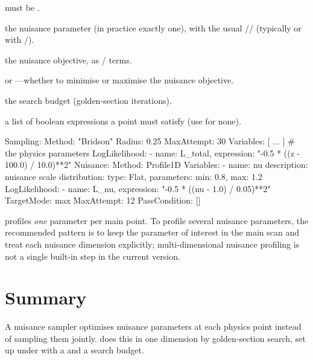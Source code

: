 \begin{description}[style=nextline, leftmargin=1.2em]
  \item[\yamlkey{Method}] must be .
  \item[\yamlkey{Variables}] the nuisance parameter (in practice exactly one), with the usual
        // (typically  or
         with /).
  \item[\yamlkey{LogLikelihood}] the nuisance objective, as /
        terms.
  \item[\yamlkey{TargetMode}]  or ---whether to minimise or maximise the
        nuisance objective.
  \item[\yamlkey{MaxAttempt}] the search budget (golden-section iterations).
  \item[\yamlkey{PassCondition}] a list of boolean expressions a point must satisfy (use \code{[]}
        for none).
\end{description}

\begin{yamlwin}
Sampling:
  Method: "Bridson"
  Radius: 0.25
  MaxAttempt: 30
  Variables: [ ... ]            # the physics parameters
  LogLikelihood:
    - {name: L_total, expression: "-0.5 * ((z - 100.0) / 10.0)**2"}
  Nuisance:
    Method: Profile1D
    Variables:
      - name: nu
        description: nuisance scale
        distribution: {type: Flat, parameters: {min: 0.8, max: 1.2}}
    LogLikelihood:
      - {name: L_nu, expression: "-0.5 * ((nu - 1.0) / 0.05)**2"}
    TargetMode: max
    MaxAttempt: 12
    PassCondition: []
\end{yamlwin}

\begin{jnote}
 profiles \emph{one} parameter per main point. To profile several nuisance
parameters, the recommended pattern is to keep the parameter of interest in the main scan and treat
each nuisance dimension explicitly; multi-dimensional nuisance profiling is not a single built-in
step in the current version.
\end{jnote}

\section{Summary}
\label{sec:nui-summary}

A nuisance sampler optimises nuisance parameters at each physics point instead of sampling them
jointly.  does this in one dimension by golden-section search, set up under
 with a  and a search budget.
